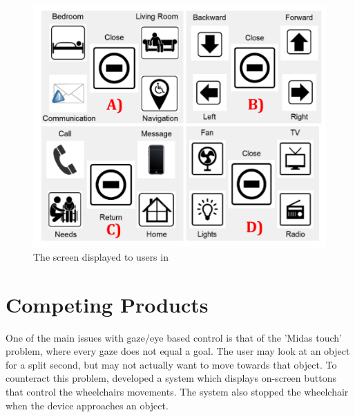 \documentclass[12pt,a4paper]{report}
\begin{document}
\begin{figure}[h!]
	\begin{center}
		\includegraphics[scale=0.4]{Images/Literature/Eye_Tracker_Control.png}
		\caption{The screen displayed to users in \cite{H.Montenegro-Couto2018}}
	\end{center}
\end{figure}

\newpage

\section{Competing Products}
One of the main issues with gaze/eye based control is that of the 'Midas touch' problem, where every gaze does not equal a goal. The user may look at an object for a split second, but may not actually want to move towards that object. To counteract this problem, \cite{Wastlund2010} developed a system which displays on-screen buttons that control the wheelchairs movements. The system also stopped the wheelchair when the device approaches an object.
\end{document}
